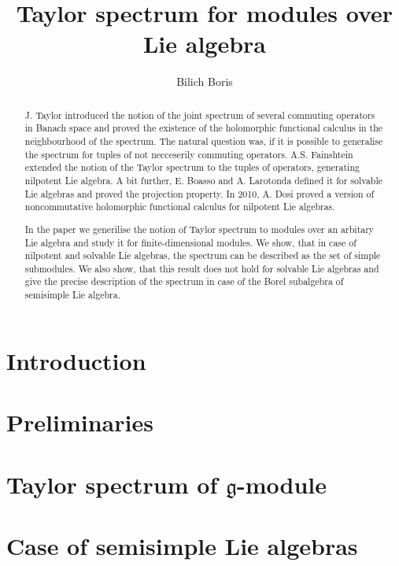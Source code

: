 \documentclass[letterpaper]{amsart}
\author{Bilich Boris}
\title{Taylor spectrum for modules over Lie algebra}
\newcommand{\lieg}{\mathfrak{g}}
\begin{document}
\maketitle

\begin{abstract}
    J. Taylor \cite{Taylor1970} introduced the notion of the joint spectrum of several commuting
    operators in Banach space and proved the existence of the holomorphic functional calculus in
    the neighbourhood of the spectrum. The natural question was, if it is possible to generalise
    the spectrum for tuples of not necceserily commuting operators. A.S. Fainshtein extended the
    notion of the Taylor spectrum to the tuples of operators, generating nilpotent Lie algebra. A
    bit further, E. Boasso and A. Larotonda defined it for solvable Lie algebras and proved the
    projection property. In 2010, A. Dosi proved a version of noncommutative holomorphic functional
    calculus for nilpotent Lie algebras.
    
    In the paper we generilise the notion of Taylor spectrum to modules over an arbitary Lie
    algebra and study it for finite-dimensional modules. We show, that in case of nilpotent and
    solvable Lie algebras, the spectrum can be described as the set of simple submodules. We also
    show, that this result does not hold for solvable Lie algebras and give the precise description
    of the spectrum in case of the Borel subalgebra of semisimple Lie algebra.
\end{abstract}

\tableofcontents
\section{Introduction}%
\label{sec:introduction}


\section{Preliminaries}%
\label{sec:preliminaries}


\section{Taylor spectrum of \texorpdfstring{$\lieg$-module}{g-module}}%
\label{sec:spectrumofmodule}


\section{Case of semisimple Lie algebras}%
\label{sec:semisimple}

\end{document}
